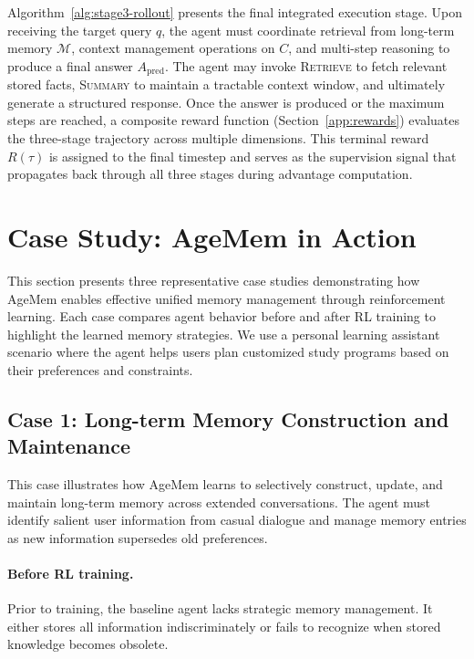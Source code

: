 Algorithm~\ref{alg:stage3-rollout} presents the final integrated execution stage. Upon receiving the target query $q$, the agent must coordinate retrieval from long-term memory $\mathcal{M}$, context management operations on $C$, and multi-step reasoning to produce a final answer $A_{\text{pred}}$. The agent may invoke \textsc{Retrieve} to fetch relevant stored facts, \textsc{Summary} to maintain a tractable context window, and ultimately generate a structured response. Once the answer is produced or the maximum steps are reached, a composite reward function (Section~\ref{app:rewards}) evaluates the three-stage trajectory across multiple dimensions. This terminal reward $R(\tau)$ is assigned to the final timestep and serves as the supervision signal that propagates back through all three stages during advantage computation.


\section{Case Study: AgeMem in Action}
\label{app:case_study}

This section presents three representative case studies demonstrating how AgeMem enables effective unified memory management through reinforcement learning. Each case compares agent behavior before and after RL training to highlight the learned memory strategies. We use a personal learning assistant scenario where the agent helps users plan customized study programs based on their preferences and constraints.

\subsection{Case 1: Long-term Memory Construction and Maintenance}

This case illustrates how AgeMem learns to selectively construct, update, and maintain long-term memory across extended conversations. The agent must identify salient user information from casual dialogue and manage memory entries as new information supersedes old preferences.

\paragraph{Before RL training.}
Prior to training, the baseline agent lacks strategic memory management. It either stores all information indiscriminately or fails to recognize when stored knowledge becomes obsolete.

